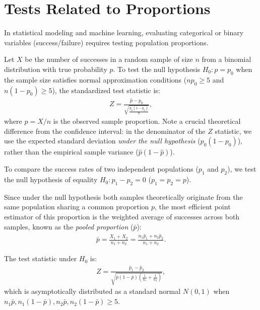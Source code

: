 \section{Tests Related to Proportions}

In statistical modeling and machine learning, evaluating categorical or binary variables (success/failure) requires testing population proportions.

\begin{teorema}
	Let $X$ be the number of successes in a random sample of size $n$ from a binomial distribution with true probability $p$. To test the null hypothesis $H_0: p = p_0$ when the sample size satisfies normal approximation conditions ($n p_0 \geq 5$ and $n(1-p_0) \geq 5$), the standardized test statistic is:
	\begin{align}
		Z = \frac{\hat{p} - p_0}{\sqrt{\frac{p_0(1-p_0)}{n}}},
	\end{align}
	where $\hat{p} = X/n$ is the observed sample proportion. Note a crucial theoretical difference from the confidence interval: in the denominator of the $Z$ statistic, we use the expected standard deviation \emph{under the null hypothesis} ($p_0(1-p_0)$), rather than the empirical sample variance ($\hat{p}(1-\hat{p})$).
\end{teorema}

\begin{teorema}
	To compare the success rates of two independent populations ($p_1$ and $p_2$), we test the null hypothesis of equality $H_0: p_1 - p_2 = 0$ ($p_1 = p_2 = p$).
	
	Since under the null hypothesis both samples theoretically originate from the same population sharing a common proportion $p$, the most efficient point estimator of this proportion is the weighted average of successes across both samples, known as the \emph{pooled proportion} ($\bar{p}$):
	\begin{align}
		\bar{p} = \frac{X_1 + X_2}{n_1 + n_2} = \frac{n_1 \hat{p}_1 + n_2 \hat{p}_2}{n_1 + n_2}.
		\label{eq:prop_combinada}
	\end{align}
	
	The test statistic under $H_0$ is:
	\begin{align}
		Z = \frac{\hat{p}_1 - \hat{p}_2}{\sqrt{\bar{p}(1-\bar{p})\left(\frac{1}{n_1} + \frac{1}{n_2}\right)}},
	\end{align}
	which is asymptotically distributed as a standard normal $N(0,1)$ when $n_1 \bar{p}, n_1(1-\bar{p}), n_2 \bar{p}, n_2(1-\bar{p}) \geq 5$.
\end{teorema}
